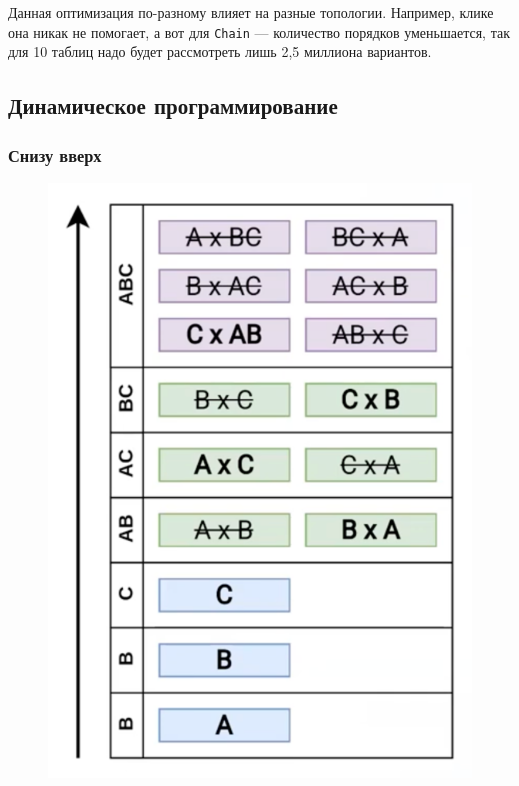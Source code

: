\documentclass[11pt]{article}
\begin{document}
    Данная оптимизация по-разному влияет на разные топологии.
    Например, клике она никак не помогает, а вот для \texttt{Chain} --- количество порядков уменьшается,
    так для 10 таблиц надо будет рассмотреть лишь 2,5 миллиона вариантов.

    \subsection{Динамическое программирование}

    \subsubsection{Снизу вверх}

    \begin{figure}[h!]
        \begin{minipage}{0.2\textwidth}
            \includegraphics[width=\textwidth]{Pictures/Dynamic Programming/Bottom up/Bottom up}

\end{minipage}
\end{figure}
\end{document}
